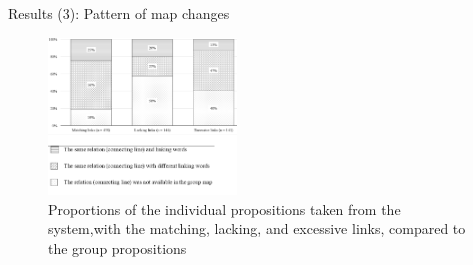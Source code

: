 \begin{frame}{Results (3): Pattern of map changes}

\begin{figure}[tb]
    \begin{center}
        \includegraphics[width=50mm]{images/dist_match_links.pdf}
    \end{center}
    \caption{Proportions of the individual propositions taken from the system,with  the  matching,  lacking,  and  excessive  links,  compared  to  the  group propositions}
    \label{a1::map_sample_1}
\end{figure}

\end{frame}

    
